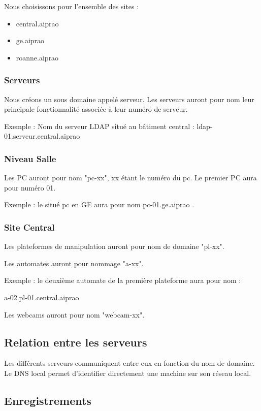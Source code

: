 Nous choisissons pour l'ensemble des sites : 
\begin{itemize}
\item central.aiprao
\item ge.aiprao
\item roanne.aiprao
\end{itemize}

\subsubsection{Serveurs}

Nous créons un sous domaine appelé serveur. Les serveurs auront pour nom leur 
principale fonctionnalité associée à leur numéro de serveur. 

Exemple : Nom du serveur LDAP situé au bâtiment central : ldap-01.serveur.central.aiprao

\subsubsection{Niveau Salle}

Les PC auront pour nom "pc-xx", xx étant le numéro du pc. Le premier PC aura 
pour numéro 01.

Exemple : le situé pc en GE aura pour nom pc-01.ge.aiprao .

\subsubsection{Site Central}

Les plateformes de manipulation auront pour nom de domaine "pl-xx".

Les automates auront pour nommage "a-xx". 

Exemple : le deuxième automate de la première plateforme aura pour nom : 

a-02.pl-01.central.aiprao

Les webcams auront pour nom "webcam-xx".

\subsection{Relation entre les serveurs}

Les différents serveurs communiquent entre eux en fonction du nom de domaine. 
Le DNS local permet d'identifier directement une machine sur son réseau local.


\subsection{Enregistrements}


